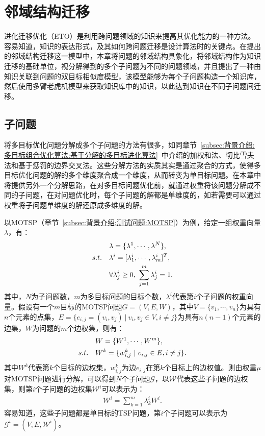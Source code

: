 \section{邻域结构迁移}
\label{sec:NST:邻域结构迁移}
进化迁移优化（ETO）是利用跨问题领域的知识来提高其优化能力的一种方法。容易知道，知识的表达形式，及其如何跨问题迁移是设计算法时的关键点。在提出的邻域结构迁移这一模型中，本章将问题的邻域结构具象化，将邻域结构作为知识迁移的基础单位，视分解得到的多个子问题为不同的问题领域，并且提出了一种由知识关联到问题的双目标相似度模型，该模型能够为每个子问题构造一个知识库，然后使用多臂老虎机模型来获取知识库中的知识，以此达到知识在不同子问题间迁移。

\subsection{子问题}
\label{subsec:NST:邻域结构迁移:子问题}
将多目标优化问题分解成多个子问题的方法有很多，如同章节~\ref{subsec:背景介绍:多目标组合优化算法:基于分解的多目标进化算法}~中介绍的加权和法、切比雪夫法和基于惩罚的边界交叉法。这些分解方法的实质其实是通过聚合的方式，使得多目标优化问题的解的多个维度聚合成一个维度，从而转变为单目标问题。在本章中将提供另外一个分解思路，在对多目标问题优化前，就通过权重将该问题分解成不同的子问题，在对问题优化时，每个子问题的解都是单维度的，如若需要可以通过权重将子问题单维度的解还原成多维度的解。
\par
以MOTSP（章节~\ref{subsec:背景介绍:测试问题:MOTSP}）为例，给定一组权重向量$\lambda$，有：
\begin{align}
    \label{eq:NST:权重向量}
    & \lambda = \{ \lambda^1, \cdots, \lambda^N \}, \\
    s.t. \quad & \lambda^{i} = [ \lambda^{i}_1, \cdots, \lambda^{i}_m ]^T, \notag \\
    & \forall \lambda^{i}_j \geq 0, \ \sum_{j=1}^m \lambda^{i}_j = 1. \notag
\end{align}
其中，$N$为子问题数，$m$为多目标问题的目标个数，$\lambda^{i}$代表第$i$个子问题的权重向量。假设有一个$m$目标的MOTSP问题$G = (V, E, W)$，其中$V = \{v_1, \cdots, v_n\}$为具有$n$个元素的点集，$E = \{ e_{i,j} = (v_i, v_j) \ | \ v_i, v_j \in V, i \not = j \}$为具有$n(n-1)$个元素的边集，$W$为问题的$m$个边权集，则有：
\begin{align}
    \label{eq:NST:边权矩阵}
    & W = \{ W^1, \cdots, W^m \}, \\
    s.t. \quad & W^k = \{ w^k_{i,j} \ | \ e_{i,j} \in E, i \not = j \}. \notag
\end{align}
其中$W^k$代表第$k$个目标的边权集，$w^k_{i,j}$为边$e_{i,j}$在第$k$个目标上的边权值。则由权重$\mu$对MOTSP问题进行分解，可以得到$N$个子问题$\mathcal{G}$，以$\mathcal{W}$代表这些子问题的边权集，则第$i$个子问题的边权集$\mathcal{W}^i$可以表示为：
\begin{align}
    \label{eq:NST:SP}
    \mathcal{W}^i = \sum_{k=1}^m  \lambda^{i}_k W^i.
\end{align}
容易知道，这些子问题都是单目标的TSP问题，第$i$个子问题可以表示为$\mathcal{G}^i = (V, E, \mathcal{W}^i)$。

